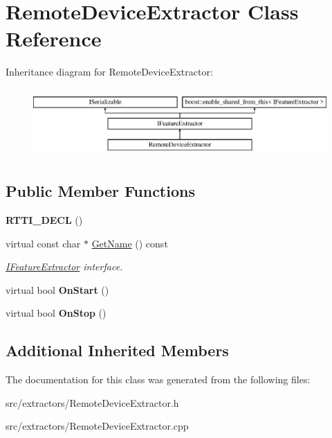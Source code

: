 \hypertarget{class_remote_device_extractor}{}\section{Remote\+Device\+Extractor Class Reference}
\label{class_remote_device_extractor}
Inheritance diagram for Remote\+Device\+Extractor\+:\begin{figure}[H]
\begin{center}
\leavevmode
\includegraphics[height=2.625000cm]{class_remote_device_extractor}
\end{center}
\end{figure}
\subsection*{Public Member Functions}
\begin{DoxyCompactItemize}
\item 
\mbox{\label{class_remote_device_extractor_a221f30988c22d2a91c23731edff59c42}} 
{\bfseries R\+T\+T\+I\+\_\+\+D\+E\+CL} ()
\item 
\mbox{\label{class_remote_device_extractor_abaad75a55e3b41e727cbb3938c79a04f}} 
virtual const char $\ast$ \hyperlink{class_remote_device_extractor_abaad75a55e3b41e727cbb3938c79a04f}{Get\+Name} () const
\begin{DoxyCompactList}\small\item\em \hyperlink{class_i_feature_extractor}{I\+Feature\+Extractor} interface. \end{DoxyCompactList}\item 
\mbox{\label{class_remote_device_extractor_ab14df1a69073ae5cd50ac687460daf59}} 
virtual bool {\bfseries On\+Start} ()
\item 
\mbox{\label{class_remote_device_extractor_a6559b553713130e398a78badb061078b}} 
virtual bool {\bfseries On\+Stop} ()
\end{DoxyCompactItemize}
\subsection*{Additional Inherited Members}


The documentation for this class was generated from the following files\+:\begin{DoxyCompactItemize}
\item 
src/extractors/Remote\+Device\+Extractor.\+h\item 
src/extractors/Remote\+Device\+Extractor.\+cpp\end{DoxyCompactItemize}
